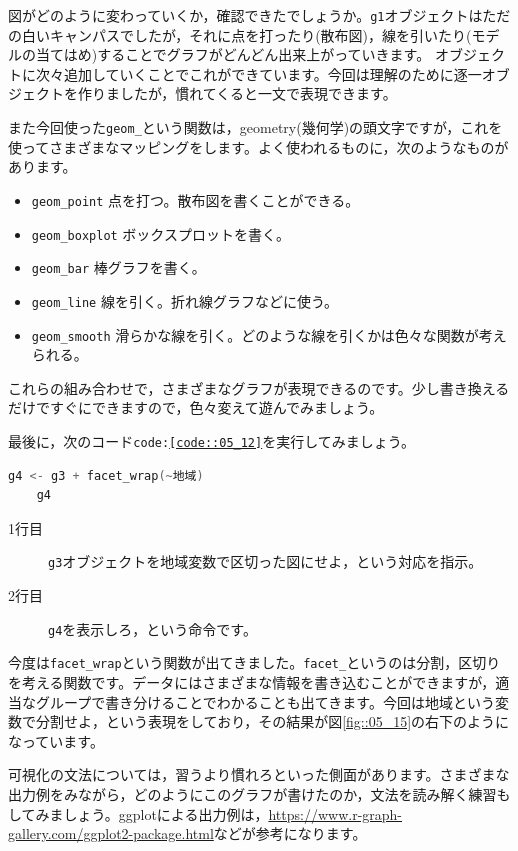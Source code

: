 \documentclass{ltjbook}
\begin{document}
図がどのように変わっていくか，確認できたでしょうか。\texttt{g1}オブジェクトはただの白いキャンパスでしたが，それに点を打ったり(散布図)，線を引いたり(モデルの当てはめ)することでグラフがどんどん出来上がっていきます。
オブジェクトに次々追加していくことでこれができています。今回は理解のために逐一オブジェクトを作りましたが，慣れてくると一文で表現できます。

また今回使った\verb|geom_|という関数は，geometry(幾何学)の頭文字ですが，これを使ってさまざまなマッピングをします。よく使われるものに，次のようなものがあります。
\begin{itemize}
	\item \verb|geom_point| 点を打つ。散布図を書くことができる。
	\item \verb|geom_boxplot| ボックスプロットを書く。
	\item \verb|geom_bar| 棒グラフを書く。
	\item \verb|geom_line| 線を引く。折れ線グラフなどに使う。
	\item \verb|geom_smooth| 滑らかな線を引く。どのような線を引くかは色々な関数が考えられる。
\end{itemize}
これらの組み合わせで，さまざまなグラフが表現できるのです。少し書き換えるだけですぐにできますので，色々変えて遊んでみましょう。

最後に，次のコード\texttt{code:\ref{code::05_12}}を実行してみましょう。
\begin{lstlisting}[language=c++,label={code::05_12},caption={線形モデルを当てはめる}]
	g4 <- g3 + facet_wrap(~地域)
	g4
\end{lstlisting}

\begin{description}
    \item[1行目] \texttt{g3}オブジェクトを地域変数で区切った図にせよ，という対応を指示。
	\item[2行目] \texttt{g4}を表示しろ，という命令です。 
\end{description}

今度は\verb|facet_wrap|という関数が出てきました。\verb|facet_|というのは分割，区切りを考える関数です。データにはさまざまな情報を書き込むことができますが，適当なグループで書き分けることでわかることも出てきます。今回は地域という変数で分割せよ，という表現をしており，その結果が図\ref{fig::05_15}の右下のようになっています。

可視化の文法については，習うより慣れろといった側面があります。さまざまな出力例をみながら，どのようにこのグラフが書けたのか，文法を読み解く練習もしてみましょう。ggplotによる出力例は，\url{https://www.r-graph-gallery.com/ggplot2-package.html}などが参考になります。
\end{document}
